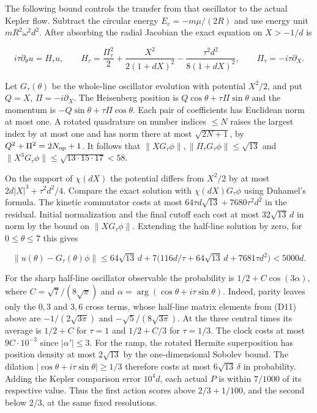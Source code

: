 \documentclass[11pt,a4paper]{article}
\begin{document}
The following bound controls the transfer from that oscillator to the
actual Kepler flow. Subtract the circular energy \(E_c=-m\mu/(2R)\) and
use energy unit \(mR^2\omega^2d^2\). After absorbing the radial Jacobian
the exact equation on \(X>-1/d\) is

\[
 i\tau\partial_\theta u=H_\tau u,\qquad
 H_\tau=\frac{\Pi_\tau^2}{2}
       +\frac{X^2}{2(1+dX)^2}-\frac{\tau^2d^2}{8(1+dX)^2},
 \qquad \Pi_\tau=-i\tau\partial_X .
\]

Let \(G_\tau(\theta)\) be the whole-line oscillator evolution with
potential \(X^2/2\), and put \(Q=X\), \(\Pi=-i\partial_X\). The
Heisenberg position is \(Q\cos\theta+\tau\Pi\sin\theta\) and the
momentum is \(-Q\sin\theta+\tau\Pi\cos\theta\). Each pair of
coefficients has Euclidean norm at most one. A rotated quadrature on
number indices \(\le N\) raises the largest index by at most one and has
norm there at most \(\sqrt{2N+1}\), by \(Q^2+\Pi^2=2N_{\rm op}+1\). It
follows that \(\|XG_\tau\phi\|,\|\Pi_\tau G_\tau\phi\|\le\sqrt{13}\) and
\(\|X^3G_\tau\phi\|\le\sqrt{13\cdot15\cdot17}<58\).

On the support of \(\chi(dX)\) the potential differs from \(X^2/2\) by
at most \(2d|X|^3+\tau^2d^2/4\). Compare the exact solution with
\(\chi(dX)G_\tau\phi\) using Duhamel's formula. The kinetic commutator
costs at most \(64\tau d\sqrt{13}+7680\tau^2d^2\) in the residual.
Initial normalization and the final cutoff each cost at most
\(32\sqrt{13}\,d\) in norm by the bound on \(\|XG_\tau\phi\|\).
Extending the half-line solution by zero, for \(0\le\theta\le7\) this
gives

\[
 \|u(\theta)-G_\tau(\theta)\phi\|
 \le 64\sqrt{13}\,d+
 7\big(116d/\tau+64\sqrt{13}\,d+7681\tau d^2\big)<5000d .
\]

For the sharp half-line oscillator observable the probability is
\(1/2+C\cos(3\alpha)\), where \(C=\sqrt7/(8\sqrt\pi)\) and
\(\alpha=\arg(\cos\theta+i\tau\sin\theta)\). Indeed, parity leaves only
the \(0,3\) and \(3,6\) cross terms, whose half-line matrix elements
from (D11) above are \(-1/(2\sqrt{3\pi})\) and
\(-\sqrt5/(8\sqrt{3\pi})\). At the three central times its average is
\(1/2+C\) for \(\tau=1\) and \(1/2+C/3\) for \(\tau=1/3\). The clock
costs at most \(9C\cdot10^{-3}\) since \(|\alpha'|\le3\). For the ramp,
the rotated Hermite superposition has position density at most
\(2\sqrt{13}\) by the one-dimensional Sobolev bound. The dilation
\(|\cos\theta+i\tau\sin\theta|\ge1/3\) therefore costs at most
\(6\sqrt{13}\,\delta\) in probability. Adding the Kepler comparison
error \(10^4d\), each actual \(P\) is within \(7/1000\) of its
respective value. Thus the first action scores above \(2/3+1/100\), and
the second below \(2/3\), at the same fixed resolutions.
\end{document}
